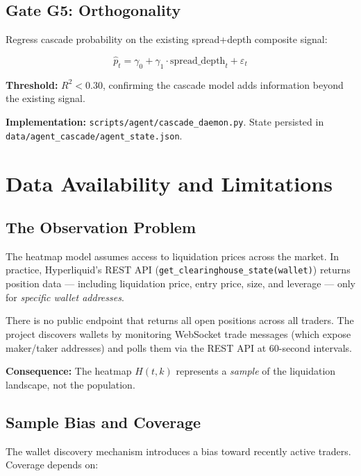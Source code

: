 \documentclass[11pt,a4paper]{article}
\begin{document}
\subsection{Gate G5: Orthogonality}

Regress cascade probability on the existing spread+depth composite signal:

\begin{equation}
\hat{p}_t = \gamma_0 + \gamma_1 \cdot \text{spread\_depth}_t + \varepsilon_t
\end{equation}

\textbf{Threshold:} $R^2 < 0.30$, confirming the cascade model adds information beyond the existing signal.

\textbf{Implementation:} \texttt{scripts/agent/cascade\_daemon.py}. State persisted in \texttt{data/agent\_cascade/agent\_state.json}.

\section{Data Availability and Limitations}
\label{sec:limitations}

\subsection{The Observation Problem}

The heatmap model assumes access to liquidation prices across the market. In practice, Hyperliquid's REST API (\texttt{get\_clearinghouse\_state(wallet)}) returns position data --- including liquidation price, entry price, size, and leverage --- only for \textit{specific wallet addresses}.

There is no public endpoint that returns all open positions across all traders. The project discovers wallets by monitoring WebSocket trade messages (which expose maker/taker addresses) and polls them via the REST API at 60-second intervals.

\textbf{Consequence:} The heatmap $H(t, k)$ represents a \textit{sample} of the liquidation landscape, not the population.

\subsection{Sample Bias and Coverage}

The wallet discovery mechanism introduces a bias toward recently active traders. Coverage depends on:
\end{document}
